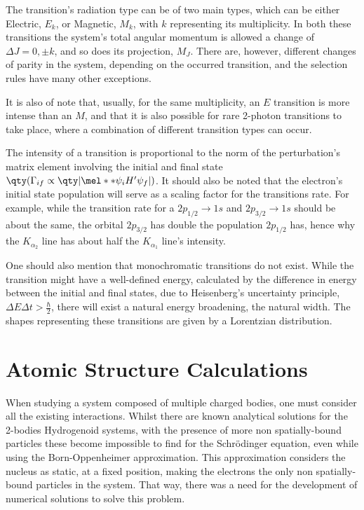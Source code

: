 The transition's radiation type can be of two main types, which can be either Electric, $E_k$, or Magnetic, $M_k$, with $k$ representing its multiplicity.
In both these transitions the system's total angular momentum is allowed a change of $\Delta J = 0, \pm k$, and so does its projection, $M_J$. There are, however,  different changes of parity in the system, depending on the occurred transition, and the selection rules have many other exceptions.

It is also of note that, usually, for the same multiplicity, an $E$ transition is more intense than an $M$, and that it is also possible for rare 2-photon transitions to take place, where a combination of different transition types can occur.



The intensity of a transition is proportional to the norm of the perturbation's matrix element involving the initial and final state $\qty(\Gamma_{if}\propto \qty|\mel**{\psi_i}{H'}{\psi_f}|)$. It should also be noted that the electron's initial state population will serve as a scaling factor for the transitions rate.
For example, while the transition rate for a $2p_{1/2}\rightarrow1s$ and $2p_{3/2}\rightarrow1s$ should be about the same, the orbital $2p_{3/2}$ has double the population $2p_{1/2}$ has, hence why the $K_{\alpha_2}$ line has about half the $K_{\alpha_1}$ line's intensity.

One should also mention that monochromatic transitions do not exist. While the transition might have a well-defined energy, calculated by the difference in energy between the initial and final states, due to Heisenberg's uncertainty principle, $\Delta E \Delta t > \frac{\hbar}{2}$, there will exist a natural energy broadening, the natural width. The shapes representing these transitions are given by a Lorentzian distribution.








\section{Atomic Structure Calculations}

When studying a system composed of multiple charged bodies, one must consider all the existing interactions. Whilst there are known analytical solutions for the 2-bodies Hydrogenoid systems, with the presence of more non spatially-bound particles these become impossible to find for the Schrödinger equation, even while using the Born-Oppenheimer approximation.
This approximation considers the nucleus as static, at a fixed position, making the electrons the only non spatially-bound particles in the system. That way, there was a need for the development of numerical solutions to solve this problem.

